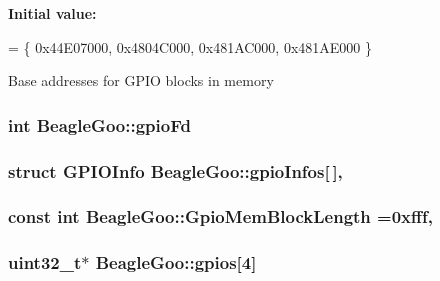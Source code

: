 {\bfseries Initial value\-:}
\begin{DoxyCode}
=
        \{ 0x44E07000, 0x4804C000, 0x481AC000, 0x481AE000 \}
\end{DoxyCode}
Base addresses for G\-P\-I\-O blocks in memory \hypertarget{struct_beagle_goo_a1d4a232a0dbb10d38249e239c7e04788}{
\subsubsection[{gpio\-Fd}]{\setlength{\rightskip}{0pt plus 5cm}int Beagle\-Goo\-::gpio\-Fd\hspace{0.3cm}{\ttfamily [protected]}}}\label{struct_beagle_goo_a1d4a232a0dbb10d38249e239c7e04788}
\hypertarget{struct_beagle_goo_a2856c2fe9e24825ffd5691ab9a53d1f8}{
\subsubsection[{gpio\-Infos}]{\setlength{\rightskip}{0pt plus 5cm}struct {\bf G\-P\-I\-O\-Info} Beagle\-Goo\-::gpio\-Infos\mbox{[}$\,$\mbox{]}\hspace{0.3cm}{\ttfamily [static]}, {\ttfamily [protected]}}}\label{struct_beagle_goo_a2856c2fe9e24825ffd5691ab9a53d1f8}
\hypertarget{struct_beagle_goo_a0d7150aa275f183b3c552ab89584f272}{
\subsubsection[{Gpio\-Mem\-Block\-Length}]{\setlength{\rightskip}{0pt plus 5cm}const int Beagle\-Goo\-::\-Gpio\-Mem\-Block\-Length =0xfff\hspace{0.3cm}{\ttfamily [static]}, {\ttfamily [protected]}}}\label{struct_beagle_goo_a0d7150aa275f183b3c552ab89584f272}
\hypertarget{struct_beagle_goo_aaa05aec2adfcadae3912e861ae35d50b}{
\subsubsection[{gpios}]{\setlength{\rightskip}{0pt plus 5cm}uint32\-\_\-t$\ast$ Beagle\-Goo\-::gpios\mbox{[}4\mbox{]}\hspace{0.3cm}{\ttfamily [protected]}}}\label{struct_beagle_goo_aaa05aec2adfcadae3912e861ae35d50b}
